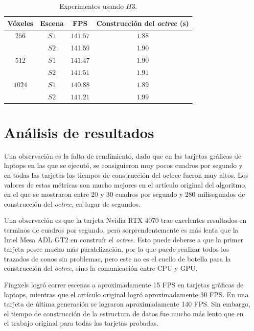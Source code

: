 \begin{table}[hb]
\centering
\begin{tabular}{|c|c|c|c|}
	\hline
	\textbf{Vóxeles} & \textbf{Escena} & \textbf{FPS} & \textbf{Construcción del \textit{octree} (s)} \\
	\hline
	$256$ & $S1$ & $141.57$ & $1.88$ \\
	 & $S2$ & 141.59 & 1.90 \\
	\hline
	$512$ & $S1$ & $141.47$ & $1.90$ \\
	 & $S2$ & $141.51$ & $1.91$ \\
	\hline
	$1024$ & $S1$ & $140.88$ & $1.89$ \\
	 & $S2$ & $141.21$ & $1.99$ \\
	\hline
\end{tabular}
\caption{Experimentos usando $H3$.}
\label{tab:pizzo-desktop}
\end{table}

\section{Análisis de resultados}

Una observación es la falta de rendimiento, dado que en las tarjetas gráficas de laptops en las que se ejecutó, se consiguieron muy pocos cuadros por segundo y en todas las tarjetas los tiempos de construcción del octree fueron muy altos.
Los valores de estas métricas son mucho mejores en el artículo original del algoritmo, en el que se mostraron entre 20 y 30 cuadros por segundo y 280 milisegundos de construcción del \textit{octree}, en lugar de segundos.

Una observación es que la tarjeta Nvidia RTX 4070 trae excelentes resultados en terminos de cuadros por segundo, pero sorprendentemente es más lenta que la Intel Mesa ADL GT2 en construír el \textit{octree}.
Esto puede deberse a que la primer tarjeta posee mucho más paralelización, por lo que puede realizar todos los trazados de conos sin problemas, pero este no es el cuello de botella para la construcción del \textit{octree}, sino la comunicación entre CPU y GPU.

Fingxels logró correr escenas a aproximadamente 15 FPS en tarjetas gráficas de laptops, mientras que el artículo original logró aproximadamente 30 FPS.
En una tarjeta de última generación se lograron aproximadamente 140 FPS.
Sin embargo, el tiempo de construcción de la estructura de datos fue mucho más lento que en el trabajo original para todas las tarjetas probadas.
